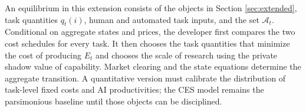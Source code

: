 An equilibrium in this extension consists of the objects in Section
\ref{sec:extended}, task quantities $q_t(i)$, human and automated task inputs,
and the set $\mathcal A_t$. Conditional on aggregate states and prices, the
developer first compares the two cost schedules for every task. It then chooses the
task quantities that minimize the cost of producing $E_t$ and chooses the scale of
research using the private shadow value of capability. Market clearing and the
state equations determine the aggregate transition. A quantitative version must
calibrate the distribution of task-level fixed costs and AI productivities; the CES
model remains the parsimonious baseline until those objects can be disciplined.
